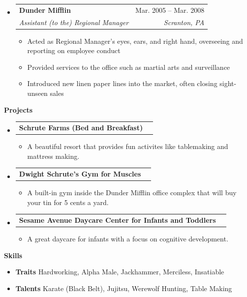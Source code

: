 \documentclass[letterpaper,12pt]{article}
\makeatletter
\def \entryspacing {-0pt}
\renewcommand{\section}[2]{\vspace{5pt}
  \colorbox{secondary}{\color{white}\raggedbottom\normalsize\textbf{{#1}{\hspace{7pt}#2}}}
}
\newcommand{\resumeEntryStart}{\begin{itemize}[leftmargin=2.5mm]}
\newcommand{\resumeEntryEnd}{\end{itemize}\vspace{\entryspacing}}
\newcommand{\resumeItemListStart}{\begin{itemize}[leftmargin=4.5mm]}
\newcommand{\resumeItemListEnd}{\end{itemize}}
\newcommand{\resumeItem}[1]{
  \item\small{
    {#1 \vspace{-2pt}}
  }
}
\newcommand{\resumeEntryTSDL}[4]{
  \vspace{-1pt}\item[]
    \begin{tabularx}{0.97\textwidth}{X@{\hspace{60pt}}r}
      \textbf{\color{primary}#1} & {\firabook\color{accent}\small#2} \\
      \textit{\color{accent}\small#3} & \textit{\color{accent}\small#4} \\
    \end{tabularx}\vspace{-6pt}
}
\newcommand{\resumeEntryTD}[2]{
  \vspace{-1pt}\item[]
    \begin{tabularx}{0.97\textwidth}{X@{\hspace{60pt}}r}
      \textbf{\color{primary}#1} & {\firabook\color{accent}\small#2} \\
    \end{tabularx}\vspace{-6pt}
}
\newcommand{\resumeEntryS}[2]{
  \item[]\small{
    \textbf{\color{primary}#1 }{ #2 \vspace{-6pt}}
  }
}
\makeatother
\begin{document}
  \resumeEntryStart
    \resumeEntryTSDL
      {Dunder Mifflin}{Mar. 2005 -- Mar. 2008}
      {Assistant (to the) Regional Manager}{Scranton, PA}
    \resumeItemListStart
      \resumeItem {Acted as Regional Manager's eyes, ears, and right hand, overseeing and reporting on employee conduct}
      \resumeItem {Provided services to the office such as martial arts and surveillance}
      \resumeItem {Introduced new linen paper lines into the market, often closing sight-unseen sales}
    \resumeItemListEnd
  \resumeEntryEnd


\section{\faFlask}{Projects}

  \resumeEntryStart
    \resumeEntryTD
      {Schrute Farms (Bed and Breakfast)}{}
    \resumeItemListStart
      \resumeItem {A beautiful resort that provides fun activites like tablemaking and mattress making.}
    \resumeItemListEnd
  \resumeEntryEnd

  \resumeEntryStart
    \resumeEntryTD
      {Dwight Schrute's Gym for Muscles}{}
    \resumeItemListStart
      \resumeItem {A built-in gym inside the Dunder Mifflin office complex that will buy your tin for 5 cents a yard.}
    \resumeItemListEnd
  \resumeEntryEnd

  \resumeEntryStart
    \resumeEntryTD
      {Sesame Avenue Daycare Center for Infants and Toddlers}{}
    \resumeItemListStart
      \resumeItem {A great daycare for infants with a focus on cognitive development.}
    \resumeItemListEnd
  \resumeEntryEnd

\section{\faGears}{Skills}
 \resumeEntryStart
  \resumeEntryS{Traits } {Hardworking, Alpha Male, Jackhammer, Merciless, Insatiable}
  \resumeEntryS{Talents } {Karate (Black Belt), Jujitsu, Werewolf Hunting, Table Making}
 \resumeEntryEnd
\end{document}
